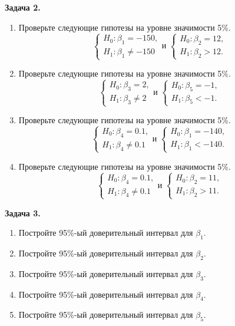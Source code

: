 \documentclass[10pt, a4paper]{extarticle}
\begin{document}
	{\Large \textbf{Задача 2.}}
	\begin{enumerate}[label=\alph*)]
		\item Проверьте следующие гипотезы на уровне значимости 5\%.
		\[
		\begin{cases}
			H_0: \beta_1 = -150, \\
			H_1: \beta_1 \ne -150
		\end{cases}\text{и } 
		\begin{cases}
			H_0: \beta_2 = 12, \\
			H_1: \beta_2 > 12.
		\end{cases}
		\]
		\item Проверьте следующие гипотезы на уровне значимости 5\%.
		\[
		\begin{cases}
			H_0: \beta_3 = 2, \\
			H_1: \beta_3 \ne 2
		\end{cases}\text{и } 
		\begin{cases}
			H_0: \beta_5 = -1, \\
			H_1: \beta_5 < -1.
		\end{cases}
		\]
		\item Проверьте следующие гипотезы на уровне значимости 5\%.
		\[
		\begin{cases}
			H_0: \beta_4 = 0.1, \\
			H_1: \beta_4 \ne 0.1
		\end{cases}\text{и } 
		\begin{cases}
			H_0: \beta_1 = -140, \\
			H_1: \beta_1 < -140.
		\end{cases}
		\]
		\item Проверьте следующие гипотезы на уровне значимости 5\%.
		\[
		\begin{cases}
			H_0: \beta_4 = 0.1, \\
			H_1: \beta_4 \ne 0.1
		\end{cases}\text{и } 
		\begin{cases}
			H_0: \beta_2 = 11, \\
			H_1: \beta_2 > 11.
		\end{cases}
		\]
	\end{enumerate}
	\vspace{1em}

	{\Large \textbf{Задача 3.}}
	\begin{enumerate}[label=\alph*)]
		\item Постройте 95\%-ый доверительный интервал для $\beta_1$.
		\item Постройте 95\%-ый доверительный интервал для $\beta_2$.
		\item Постройте 95\%-ый доверительный интервал для $\beta_3$.
		\item Постройте 95\%-ый доверительный интервал для $\beta_4$.
		\item Постройте 95\%-ый доверительный интервал для $\beta_5$.
	\end{enumerate}
\end{document}
